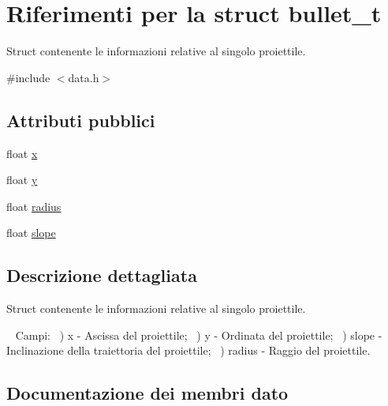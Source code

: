 \hypertarget{structbullet__t}{}\section{Riferimenti per la struct bullet\+\_\+t}
\label{structbullet__t}


Struct contenente le informazioni relative al singolo proiettile.  




{\ttfamily \#include $<$data.\+h$>$}

\subsection*{Attributi pubblici}
\begin{DoxyCompactItemize}
\item 
float \hyperlink{structbullet__t_ab0b36c8d15cc32e097f747f274af575b}{x}
\item 
float \hyperlink{structbullet__t_a6fe52258dc3b178d28487fae71363524}{y}
\item 
float \hyperlink{structbullet__t_ad6ee15b9312ba0ba6e7a3b9ed04b9c16}{radius}
\item 
float \hyperlink{structbullet__t_a0963dc6b0252c985a01f059e92eace09}{slope}
\end{DoxyCompactItemize}


\subsection{Descrizione dettagliata}
Struct contenente le informazioni relative al singolo proiettile. 

~\newline
Campi\+: ~) x -\/ Ascissa del proiettile; ~) y -\/ Ordinata del proiettile; ~) slope -\/ Inclinazione della traiettoria del proiettile; ~) radius -\/ Raggio del proiettile. 

\subsection{Documentazione dei membri dato}
\mbox{\label{structbullet__t_ad6ee15b9312ba0ba6e7a3b9ed04b9c16}} 

